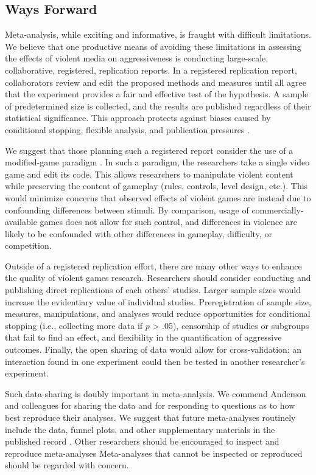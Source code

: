 \documentclass[man, mask]{apa6}
\begin{document}
\subsection{Ways Forward}
Meta-analysis, while exciting and informative, is fraught with difficult limitations.  We believe that one productive means of avoiding these limitations in assessing the effects of violent media on aggressiveness is conducting large-scale, collaborative, registered, replication reports. In a registered replication report, collaborators review and edit the proposed methods and measures until all agree that the experiment provides a fair and effective test of the hypothesis. A sample of predetermined size is collected, and the results are published regardless of their statistical significance. This approach protects against biases caused by conditional stopping, flexible analysis, and publication pressures \citep[see, e.g.,][]{Hagger:etal:inpress,Matzke:etal:2015}.  

We suggest that those planning such a registered report consider the use of a modified-game paradigm \citep{Elson:Quandt:2014,Engelhardt:etal:2015a,Engelhardt:etal:2015,Elson:etal:2013,Kneer:etal:inpress}. In such a paradigm, the researchers take a single video game and edit its code. This allows researchers to manipulate violent content while preserving the content of gameplay (rules, controls, level design, etc.). This would minimize concerns that observed effects of violent games are instead due to confounding differences between stimuli. By comparison, usage of commercially-available games does not allow for such control, and differences in violence are likely to be confounded with other differences in gameplay, difficulty, or competition.

Outside of a registered replication effort, there are many other ways to enhance the quality of violent games research. Researchers should consider conducting and publishing direct replications of each others' studies. Larger sample sizes would increase the evidentiary value of individual studies. Preregistration of sample size, measures, manipulations, and analyses would reduce opportunities for conditional stopping (i.e., collecting more data if $p$ > .05), censorship of studies or subgroups that fail to find an effect, and flexibility in the quantification of aggressive outcomes. Finally, the open sharing of data would allow for cross-validation: an interaction found in one experiment could then be tested in another researcher's experiment.

Such data-sharing is doubly important in meta-analysis. We commend Anderson and colleagues for sharing the data and for responding to questions as to how best reproduce their analyses. We suggest that future meta-analyses routinely include the data, funnel plots, and other supplementary materials in the published record \citep{Lakens:etal:InPress}. Other researchers should be encouraged to inspect and reproduce meta-analyses  Meta-analyses that cannot be inspected or reproduced should be regarded with concern.
\end{document}
